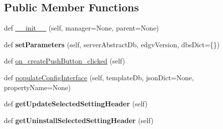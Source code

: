 \subsection*{Public Member Functions}
\begin{DoxyCompactItemize}
\item 
def \mbox{\hyperlink{class_dsg_tools_1_1_custom_widgets_1_1earth_coverage_manager_widget_1_1_earth_coverage_manager_widget_af0fef9b021115a767cbc9db6ef39c105}{\+\_\+\+\_\+init\+\_\+\+\_\+}} (self, manager=None, parent=None)
\item 
\mbox{\label{class_dsg_tools_1_1_custom_widgets_1_1earth_coverage_manager_widget_1_1_earth_coverage_manager_widget_acc1a1dc632c474fd62372fcdd376edf5}} 
def {\bfseries set\+Parameters} (self, server\+Abstract\+Db, edgv\+Version, dbs\+Dict=\{\})
\item 
def \mbox{\hyperlink{class_dsg_tools_1_1_custom_widgets_1_1earth_coverage_manager_widget_1_1_earth_coverage_manager_widget_a12ec4dd59b87fa7c3838aceeda62742d}{on\+\_\+create\+Push\+Button\+\_\+clicked}} (self)
\item 
def \mbox{\hyperlink{class_dsg_tools_1_1_custom_widgets_1_1earth_coverage_manager_widget_1_1_earth_coverage_manager_widget_a64ae0f66203378930f749b2993c4474b}{populate\+Config\+Interface}} (self, template\+Db, json\+Dict=None, property\+Name=None)
\item 
\mbox{\label{class_dsg_tools_1_1_custom_widgets_1_1earth_coverage_manager_widget_1_1_earth_coverage_manager_widget_a13b9f40c52a90af3814a1ddaecc5f539}} 
def {\bfseries get\+Update\+Selected\+Setting\+Header} (self)
\item 
\mbox{\label{class_dsg_tools_1_1_custom_widgets_1_1earth_coverage_manager_widget_1_1_earth_coverage_manager_widget_a5be48e14a0e5a3fde73a1ab4465f48f8}} 
def {\bfseries get\+Uninstall\+Selected\+Setting\+Header} (self)
\item 
\mbox{\label{class_dsg_tools_1_1_custom_widgets_1_1earth_coverage_manager_widget_1_1_earth_coverage_manager_widget_ac72743a3ab446d633237ccbacc617c9c}} 

\end{DoxyCompactItemize}
